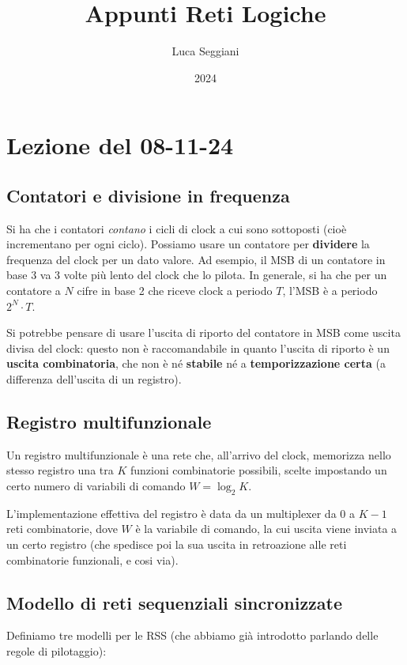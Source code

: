 \documentclass[a4paper,11pt]{article}
\title{Appunti Reti Logiche}
\author{Luca Seggiani}
\date{2024}
\begin{document}
\section{Lezione del 08-11-24}

\thispagestyle{empty}
\pagestyle{fancy}

\subsection{Contatori e divisione in frequenza}
Si ha che i contatori \textit{contano} i cicli di clock a cui sono sottoposti (cioè incrementano per ogni ciclo).
Possiamo usare un contatore per \textbf{dividere} la frequenza del clock per un dato valore.
Ad esempio, il MSB di un contatore in base 3 va 3 volte più lento del clock che lo pilota.
In generale, si ha che per un contatore a $N$ cifre in base 2 che riceve clock a periodo $T$, l'MSB è a periodo $2^N \cdot T$.

Si potrebbe pensare di usare l'uscita di riporto del contatore in MSB come uscita divisa del clock: questo non è raccomandabile in quanto l'uscita di riporto è un \textbf{uscita combinatoria}, che non è né \textbf{stabile} né a \textbf{temporizzazione certa} (a differenza dell'uscita di un registro).

\subsection{Registro multifunzionale}
Un registro multifunzionale è una rete che, all'arrivo del clock, memorizza nello stesso registro una tra $K$ funzioni combinatorie possibili, scelte impostando un certo numero di variabili di comando $W = \log_2 K$.

L'implementazione effettiva del registro è data da un multiplexer da $0$ a $K-1$ reti combinatorie, dove $W$ è la variabile di comando, la cui uscita viene inviata a un certo registro (che spedisce poi la sua uscita in retroazione alle reti combinatorie funzionali, e cosi via).

\subsection{Modello di reti sequenziali sincronizzate}
Definiamo tre modelli per le RSS (che abbiamo già introdotto parlando delle regole di pilotaggio):
\end{document}
